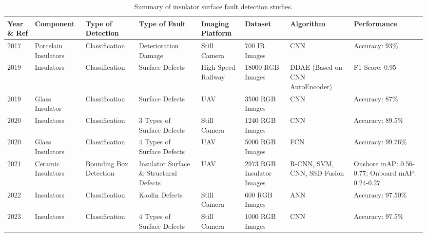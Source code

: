 \begin{table*}[htb]
\scriptsize
\caption{Summary of insulator surface fault detection studies.}
\label{tab:insulator_surface_faults} 
\begin{tabular}{P{.05} P{.1} P{.1} P{.1} P{.1} P{.15} P{.1} P{.1}}  

\hline  
Year \& Ref & Component & Type of Detection & Type of Fault & Imaging Platform & Dataset & Algorithm & Performance \\ 
\hline 

2017 \cite{liu_discrimination_2017} & Porcelain Insulators & Classification & Deterioration Damage & Still Camera & 700 IR Images & CNN & Accuracy: 93\% \\

2019 \cite{kang_deep_2019} & Insulators & Classification & Surface Defects & High Speed Railway & 18000 RGB Images & DDAE (Based on CNN AutoEncoder) & F1-Score: 0.95 \\

2019 \cite{sadykova2019yolo} & Glass Insulator & Classification & Surface Defects & UAV & 3500 RGB Images & CNN & Accuracy: 87\% \\

2020 \cite{ibrahim_application_2020} & Insulators & Classification & 3 Types of Surface Defects & Still Camera & 1240 RGB Images & CNN & Accuracy: 89.5\% \\

2020 \cite{mussina_multi_modal_2020} & Glass Insulators & Classification & 4 Types of Surface Defects & UAV & 5000 RGB Images & FCN & Accuracy: 99.76\% \\

2021 \cite{waleed_drone_based_2021} & Ceramic Insulators & Bounding Box Detection & Insulator Surface \& Structural Defects & UAV & 2973 RGB Insulator Images & R-CNN, SVM, CNN, SSD Fusion & Onshore mAP: 0.56-0.77; Onboard mAP: 0.24-0.27 \\

2022 \cite{stefenon_classification_2022} & Insulators & Classification & Kaolin Defects & Still Camera & 600 RGB Images & ANN & Accuracy: 97.50\% \\

2023 \cite{roy_accurate_2023} & Insulators & Classification & 4 Types of Surface Defects & Still Camera & 1000 RGB Images & CNN & Accuracy: 97.5\% \\
\hline

\end{tabular}
\end{table*}

